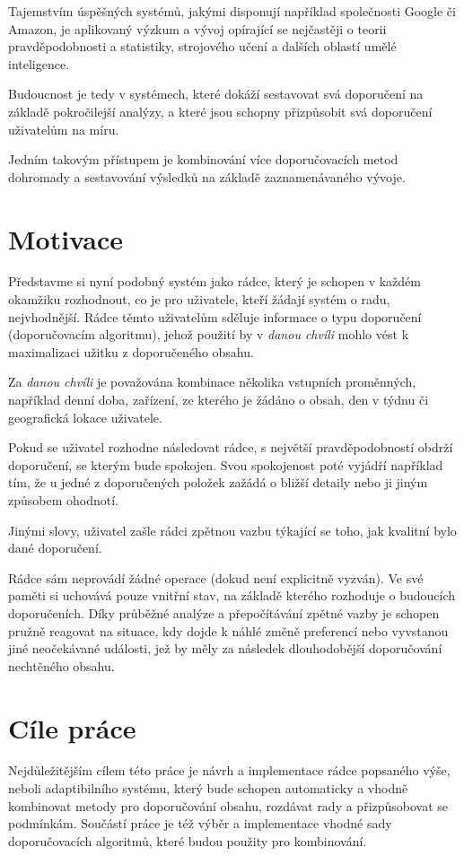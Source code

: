 \documentclass[thesis=M,czech]{FITthesis}[2014/05/07]
\begin{document}
\begin{introduction}
	Tajemstvím úspěšných systémů, jakými disponují například společnosti Google či Amazon, je aplikovaný výzkum a vývoj opírající se nejčastěji o teorii pravděpodobnosti a statistiky, strojového učení a dalších oblastí umělé inteligence.

	Budoucnost je tedy v systémech, které dokáží sestavovat svá doporučení na základě pokročilejší analýzy, a které jsou schopny přizpůsobit svá doporučení uživatelům na míru.
	
	Jedním takovým přístupem je kombinování více doporučovacích metod dohromady a sestavování výsledků na základě zaznamenávaného vývoje.

\section{Motivace} 	
\label{sec:motivation}
	Představme si nyní podobný systém jako rádce, který je schopen v každém okamžiku rozhodnout, co je pro uživatele, kteří žádají systém o radu, nejvhodnější. Rádce těmto uživatelům sděluje informace o typu doporučení (doporučovacím algoritmu), jehož použití by v \emph{danou chvíli} mohlo vést k maximalizaci užitku z doporučeného obsahu.
	
	Za \emph{danou chvíli} je považována kombinace několika vstupních proměnných, například denní doba, zařízení, ze kterého je žádáno o obsah, den v týdnu či geografická lokace uživatele.
	
	Pokud se uživatel rozhodne následovat rádce, s největší pravděpodobností obdrží doporučení, se kterým bude spokojen. Svou spokojenost poté vyjádří například tím, že u jedné z doporučených položek zažádá o bližší detaily nebo ji jiným způsobem ohodnotí. 
	
	Jinými slovy, uživatel zašle rádci zpětnou vazbu týkající se toho, jak kvalitní bylo dané doporučení.
	
	Rádce sám neprovádí žádné operace (dokud není explicitně vyzván). Ve své paměti si uchovává pouze vnitřní stav, na základě kterého rozhoduje o budoucích doporučeních. Díky průběžné analýze a přepočítávání zpětné vazby je schopen pružně reagovat na situace, kdy dojde k náhlé změně preferencí nebo vyvstanou jiné neočekávané události, jež by měly za následek dlouhodobější doporučování nechtěného obsahu.
	
\section{Cíle práce}
\label{sec:objectives}
	Nejdůležitějším cílem této práce je návrh a implementace rádce popsaného výše, neboli adaptibilního systému, který bude schopen automaticky a vhodně kombinovat metody pro doporučování obsahu, rozdávat rady a přizpůsobovat se podmínkám. Součástí práce je též výběr a implementace vhodné sady doporučovacích algoritmů, které budou použity pro kombinování.


\end{introduction}
\end{document}
